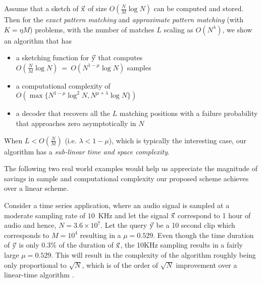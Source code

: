 	Assume that a sketch of $\vec{\mathrm{x}}$ of size $O(\frac{N}{M} \log N)$ can be computed and stored. Then for the {\it exact pattern matching} and {\it approximate pattern matching} (with $K = \eta M$) problems, with the number of matches $L$ scaling as $O(N^{\lambda})$, we show an algorithm that has
	\begin{itemize}
		\item a sketching function for $\vec{\mathrm{y}}$ that computes \\ $O(\frac{N}{M}\log N)~=~ O\left(N^{1-\mu}\log N\right)$ samples
		\item a computational complexity of \\$O\left(\max\{N^{1-\mu}\log^2 N, N^{\mu+\lambda}\log N \}\right)$
		\item a decoder that recovers all the $L$ matching positions with a failure probability that approaches zero asymptotically in $N$		
	\end{itemize} \vspace{-5pt}
	When $L<O\left(\frac{N}{M}\right)$ (i.e. $\lambda<1-\mu$), which is typically the interesting case, our algorithm has a {\it sub-linear time and space complexity}.
	
	The following two real world examples would help us appreciate the magnitude of savings in sample and computational complexity our proposed scheme achieves over a linear scheme.   
	\begin{example}  Consider a time series application, where an audio signal is sampled at a moderate sampling rate of $10$~KHz and let the signal $\vec{\mathrm{x}}$ correspond to 1 hour of audio and hence, $N = 3.6 \times 10^7$. Let the query $\vec{\mathrm{y}}$ be a 10 second clip which corresponds to $M = 10^4$ resulting in a $\mu = 0.529$. Even though the time duration of $\vec{\mathrm{y}}$ is only 0.3\% of the duration of $\vec{\mathrm{x}}$, the 10KHz sampling results in a fairly large $\mu = 0.529$. This will result in the complexity of the algorithm roughly being only proportional to $\sqrt{N}$, which is of the order of $\sqrt{N}$ improvement over a linear-time algorithm .
	\end{example}
	
